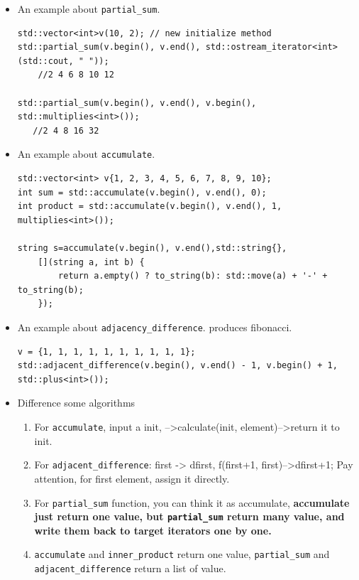 \documentclass[a4paper,11pt,twoside]{book}
\begin{document}
\begin{itemize}

\item An example about \texttt{partial\_sum}.

\begin{lstlisting}[numbers=none]
std::vector<int>v(10, 2); // new initialize method
std::partial_sum(v.begin(), v.end(), std::ostream_iterator<int>(std::cout, " "));
    //2 4 6 8 10 12

std::partial_sum(v.begin(), v.end(), v.begin(), std::multiplies<int>());
   //2 4 8 16 32
\end{lstlisting}
\item An example about \texttt{accumulate}.

\begin{lstlisting}[numbers=none]
std::vector<int> v{1, 2, 3, 4, 5, 6, 7, 8, 9, 10};
int sum = std::accumulate(v.begin(), v.end(), 0);
int product = std::accumulate(v.begin(), v.end(), 1, multiplies<int>());

string s=accumulate(v.begin(), v.end(),std::string{},
    [](string a, int b) {
    	return a.empty() ? to_string(b): std::move(a) + '-' + to_string(b); 
    });
\end{lstlisting}

\item An example about \texttt{adjacency\_difference}. produces fibonacci.
\begin{lstlisting}[numbers=none]
v = {1, 1, 1, 1, 1, 1, 1, 1, 1, 1};
std::adjacent_difference(v.begin(), v.end() - 1, v.begin() + 1, std::plus<int>());
\end{lstlisting}

\item Difference some algorithms
\begin{enumerate}
\item For \texttt{accumulate}, input a init, -->calculate(init, element)-->return it to init.
\item For \texttt{adjacent\_difference}:   first -> dfirst,  f(first+1, first)-->dfirst+1; Pay attention, for first element, assign it directly.
\item For \texttt{partial\_sum} function, you can think it as accumulate, \textbf{accumulate just return one value, but \texttt{partial\_sum} return many value, and write them back to target iterators one by one.  }
\item \texttt{accumulate} and \texttt{inner\_product} return one value, \texttt{partial\_sum} and \texttt{adjacent\_difference} return a list of value.
\end{enumerate}

\end{itemize}
\end{document}
